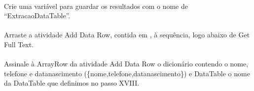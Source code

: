 \documentclass[letterpaper,10pt,brazil]{sphinxmanual}
\begin{document}
\begin{figure}[htbp]
\centering

\noindent{}
\end{figure}


\paragraph{}
\label{\detokenize{exercise_2:xx-alterar-tipo-da-variavel}}
Crie uma variável para guardar os resultados com o nome de “ExtracaoDataTable”.

\begin{figure}[htbp]
\centering

\noindent{}
\end{figure}

\begin{figure}[htbp]
\centering

\noindent{}
\end{figure}


\paragraph{}
\label{\detokenize{exercise_2:xxi-adicionar-atividade-adddatarow}}
Arraste a atividade Add Data Row, contida em , à sequência, logo abaixo de Get Full Text.

\begin{figure}[htbp]
\centering

\noindent{}
\end{figure}


\paragraph{}
\label{\detokenize{exercise_2:xxii-assinalar-adddatarow}}
Assinale à ArrayRow da atividade Add Data Row o dicionário contendo o nome, telefone e datanascimento (\{nome,telefone,datanascimento\}) e DataTable o nome da DataTable que definimos no passo XVIII.

\begin{figure}[htbp]
\centering

\noindent{}
\end{figure}
\end{document}
